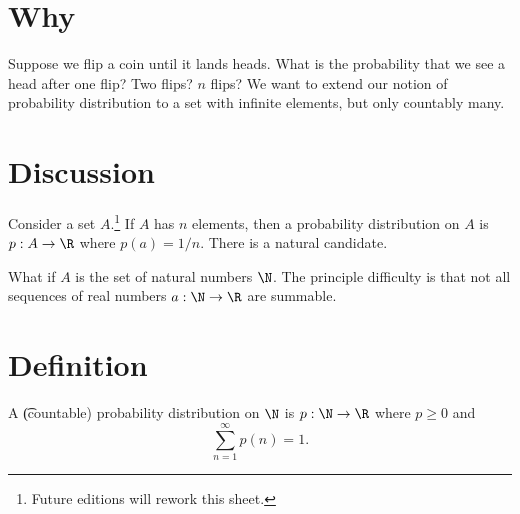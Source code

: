 

\section*{Why}

Suppose we flip a coin until it lands heads.
What is the probability that we see a head after one flip?
Two flips?
$n$ flips?
We want to extend our notion of probability distribution to a set with infinite elements, but only countably many.

\section*{Discussion}

Consider a set $A$.\footnote{Future editions will rework this sheet.}
If $A$ has $n$ elements, then a probability distribution on $A$ is $p: A \to \R $ where $p(a) = 1/n$.
There is a natural candidate.

What if $A$ is the set of natural numbers $\N  $.
The principle difficulty is that not all sequences
of real numbers $a: \N   \to \R $ are summable.

\section*{Definition}

A \t{(countable) probability distribution} on $\N  $ is $p: \N \to \R $ where $p \geq 0$ and
\[
\textstyle
\sum_{n =1}^{\infty} p(n) = 1.
\]

\blankpage